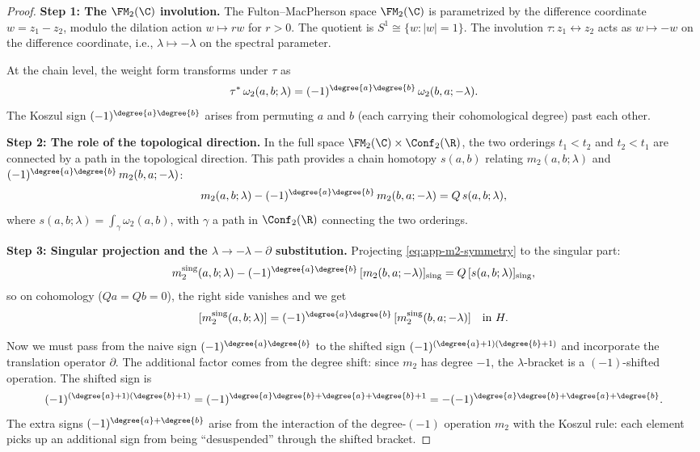 \begin{proof}
\textbf{Step 1: The $\FM_2(\C)$ involution.}
The Fulton--MacPherson space $\FM_2(\C)$ is parametrized by the difference coordinate $w = z_1 - z_2$, modulo the dilation action $w \mapsto rw$ for $r > 0$. The quotient is $S^1 \cong \{w : |w|=1\}$. The involution $\tau: z_1 \leftrightarrow z_2$ acts as $w \mapsto -w$ on the difference coordinate, i.e., $\lambda \mapsto -\lambda$ on the spectral parameter.

At the chain level, the weight form transforms under $\tau$ as
\[
\tau^*\,\omega_2(a,b;\lambda) = (-1)^{\degree{a}\degree{b}}\,\omega_2(b,a;-\lambda).
\]
The Koszul sign $(-1)^{\degree{a}\degree{b}}$ arises from permuting $a$ and $b$ (each carrying their cohomological degree) past each other.

\textbf{Step 2: The role of the topological direction.}
In the full space $\FM_2(\C) \times \Conf_2(\R)$, the two orderings $t_1 < t_2$ and $t_2 < t_1$ are connected by a path in the topological direction. This path provides a chain homotopy $s(a,b)$ relating $m_2(a,b;\lambda)$ and $(-1)^{\degree{a}\degree{b}}\,m_2(b,a;-\lambda)$:
\begin{equation}
\label{eq:app-m2-symmetry}
m_2(a,b;\lambda) - (-1)^{\degree{a}\degree{b}}\,m_2(b,a;-\lambda) = Q\,s(a,b;\lambda),
\end{equation}
where $s(a,b;\lambda) = \int_{\gamma} \omega_2(a,b)$, with $\gamma$ a path in $\Conf_2(\R)$ connecting the two orderings.

\textbf{Step 3: Singular projection and the $\lambda \to -\lambda - \partial$ substitution.}
Projecting \eqref{eq:app-m2-symmetry} to the singular part:
\[
m_2^{\mathrm{sing}}(a,b;\lambda) - (-1)^{\degree{a}\degree{b}}\,[m_2(b,a;-\lambda)]_{\mathrm{sing}} = Q\,[s(a,b;\lambda)]_{\mathrm{sing}},
\]
so on cohomology ($Qa = Qb = 0$), the right side vanishes and we get
\begin{equation}
\label{eq:app-sing-sym}
[m_2^{\mathrm{sing}}(a,b;\lambda)] = (-1)^{\degree{a}\degree{b}}\,[m_2^{\mathrm{sing}}(b,a;-\lambda)] \quad \text{in }H.
\end{equation}

Now we must pass from the naive sign $(-1)^{\degree{a}\degree{b}}$ to the shifted sign $(-1)^{(\degree{a}+1)(\degree{b}+1)}$ and incorporate the translation operator $\partial$. The additional factor comes from the degree shift: since $m_2$ has degree $-1$, the $\lambda$-bracket is a $(-1)$-shifted operation. The shifted sign is
\[
(-1)^{(\degree{a}+1)(\degree{b}+1)} = (-1)^{\degree{a}\degree{b} + \degree{a} + \degree{b} + 1} = -(-1)^{\degree{a}\degree{b}+\degree{a}+\degree{b}}.
\]
The extra signs $(-1)^{\degree{a}+\degree{b}}$ arise from the interaction of the degree-$(-1)$ operation $m_2$ with the Koszul rule: each element picks up an additional sign from being ``desuspended'' through the shifted bracket.


\end{proof}

